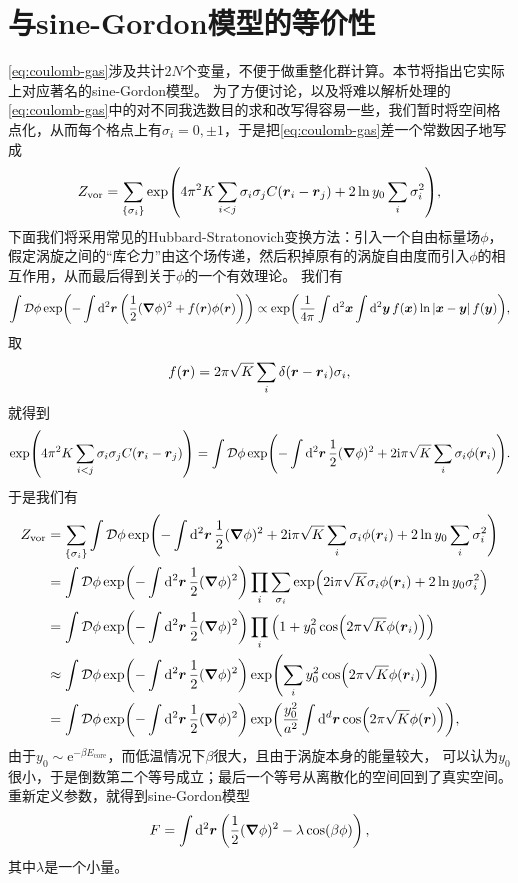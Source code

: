\documentclass[hyperref, UTF8, a4paper]{ctexart}
\newcommand*{\ii}{\mathrm{i}}
\newcommand*{\ee}{\mathrm{e}}
\newcommand*{\fd}[1]{\mathcal{D} #1}
\begin{document}
\section{与sine-Gordon模型的等价性}\label{sec:sine-gordon}


\eqref{eq:coulomb-gas}涉及共计$2N$个变量，不便于做重整化群计算。本节将指出它实际上对应著名的sine-Gordon模型。
为了方便讨论，以及将难以解析处理的\eqref{eq:coulomb-gas}中的对不同我选数目的求和改写得容易一些，我们暂时将空间格点化，从而每个格点上有$\sigma_i = 0, \pm 1$，于是把\eqref{eq:coulomb-gas}差一个常数因子地写成
\[
    Z_\text{vor} = \sum_{\{\sigma_i\}} \exp(4 \pi^2 K \sum_{i < j} \sigma_i \sigma_j C(\vb*{r}_i - \vb*{r}_j) + 2 \ln y_0 \sum_i \sigma_i^2),
\]
下面我们将采用常见的Hubbard-Stratonovich变换方法：引入一个自由标量场$\phi$，假定涡旋之间的“库仑力”由这个场传递，然后积掉原有的涡旋自由度而引入$\phi$的相互作用，从而最后得到关于$\phi$的一个有效理论。
我们有
\[
    \int \fd{\phi} \exp(- \int \dd[2]{\vb*{r}} \left( \frac{1}{2} (\grad{\phi})^2 + f(\vb*{r}) \phi(\vb*{r}) \right) ) \propto \exp(\frac{1}{4\pi} \int \dd[2]{\vb*{x}} \int \dd[2]{\vb*{y}} f(\vb*{x}) \ln \abs*{\vb*{x} - \vb*{y}} f(\vb*{y})),
\]
取
\[
    f(\vb*{r}) = 2 \pi \sqrt{K} \sum_i \delta(\vb*{r} - \vb*{r}_i) \sigma_i,
\]
就得到
\[
    \exp(4 \pi^2 K \sum_{i < j} \sigma_i \sigma_j C(\vb*{r}_i - \vb*{r}_j)) = \int \fd{\phi} \exp(- \int \dd[2]{\vb*{r}} \frac{1}{2} (\grad{\phi})^2 + 2\ii \pi \sqrt{K} \sum_i \sigma_i \phi(\vb*{r}_i) ).
\]
于是我们有
\[
    \begin{aligned}
        Z_\text{vor} &= \sum_{\{\sigma_i\}} \int \fd{\phi} \exp(- \int \dd[2]{\vb*{r}} \frac{1}{2} (\grad{\phi})^2 + 2\ii \pi \sqrt{K} \sum_i \sigma_i \phi(\vb*{r}_i) + 2 \ln y_0 \sum_i \sigma_i^2) \\
        &= \int \fd{\phi} \exp(- \int \dd[2]{\vb*{r}} \frac{1}{2} (\grad{\phi})^2) \prod_i \sum_{\sigma_i} \exp( 2\ii \pi \sqrt{K} \sigma_i \phi(\vb*{r}_i) + 2 \ln y_0  \sigma_i^2) \\
        &= \int \fd{\phi} \exp(- \int \dd[2]{\vb*{r}} \frac{1}{2} (\grad{\phi})^2) \prod_i \left( 1 + y_0^2 \cos (2 \pi \sqrt{K} \phi(\vb*{r}_i)) \right) \\
        &\approx \int \fd{\phi} \exp(- \int \dd[2]{\vb*{r}} \frac{1}{2} (\grad{\phi})^2) \exp(\sum_i y_0^2 \cos(2\pi \sqrt{K} \phi(\vb*{r}_i) )) \\
        &= \int \fd{\phi} \exp(- \int \dd[2]{\vb*{r}} \frac{1}{2} (\grad{\phi})^2) \exp(\frac{y_0^2}{a^2} \int \dd[d]{\vb*{r}} \cos(2\pi \sqrt{K} \phi(\vb*{r}) )),
    \end{aligned}
\]
由于$y_0 \sim \ee^{- \beta E_\text{core}}$，而低温情况下$\beta$很大，且由于涡旋本身的能量较大， %
可以认为$y_0$很小，于是倒数第二个等号成立；最后一个等号从离散化的空间回到了真实空间。
重新定义参数，就得到sine-Gordon模型
\begin{equation}
    F = \int \dd[2]{\vb*{r}} \left( \frac{1}{2} (\grad{\phi})^2 - \lambda \cos(\beta \phi) \right),
    \label{eq:sine-gordon}
\end{equation}
其中$\lambda$是一个小量。
\end{document}
